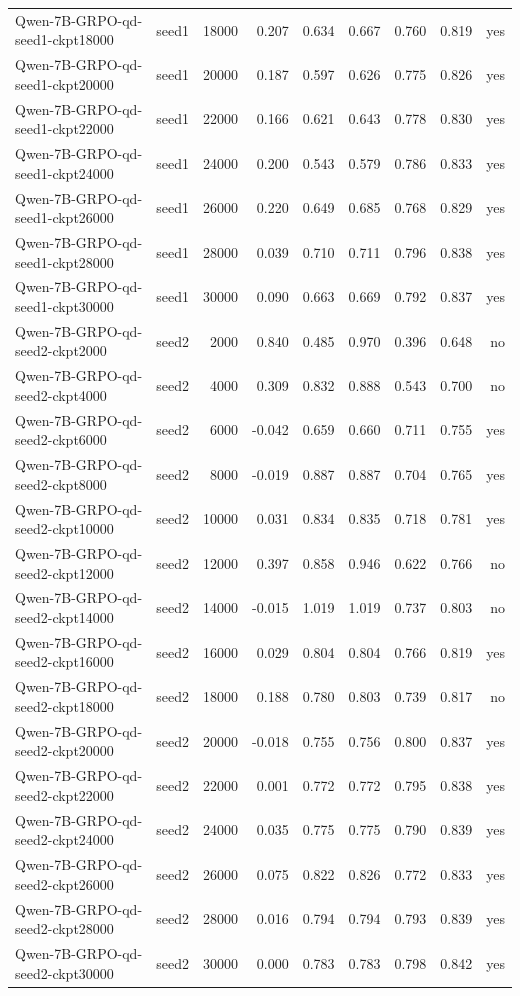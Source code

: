 \begin{tabular}{llrrrrrrr}
Qwen-7B-GRPO-qd-seed1-ckpt18000 & seed1 & 18000 & 0.207 & 0.634 & 0.667 & 0.760 & 0.819 & yes \\
Qwen-7B-GRPO-qd-seed1-ckpt20000 & seed1 & 20000 & 0.187 & 0.597 & 0.626 & 0.775 & 0.826 & yes \\
Qwen-7B-GRPO-qd-seed1-ckpt22000 & seed1 & 22000 & 0.166 & 0.621 & 0.643 & 0.778 & 0.830 & yes \\
Qwen-7B-GRPO-qd-seed1-ckpt24000 & seed1 & 24000 & 0.200 & 0.543 & 0.579 & 0.786 & 0.833 & yes \\
Qwen-7B-GRPO-qd-seed1-ckpt26000 & seed1 & 26000 & 0.220 & 0.649 & 0.685 & 0.768 & 0.829 & yes \\
Qwen-7B-GRPO-qd-seed1-ckpt28000 & seed1 & 28000 & 0.039 & 0.710 & 0.711 & 0.796 & 0.838 & yes \\
Qwen-7B-GRPO-qd-seed1-ckpt30000 & seed1 & 30000 & 0.090 & 0.663 & 0.669 & 0.792 & 0.837 & yes \\
Qwen-7B-GRPO-qd-seed2-ckpt2000 & seed2 & 2000 & 0.840 & 0.485 & 0.970 & 0.396 & 0.648 & no \\
Qwen-7B-GRPO-qd-seed2-ckpt4000 & seed2 & 4000 & 0.309 & 0.832 & 0.888 & 0.543 & 0.700 & no \\
Qwen-7B-GRPO-qd-seed2-ckpt6000 & seed2 & 6000 & -0.042 & 0.659 & 0.660 & 0.711 & 0.755 & yes \\
Qwen-7B-GRPO-qd-seed2-ckpt8000 & seed2 & 8000 & -0.019 & 0.887 & 0.887 & 0.704 & 0.765 & yes \\
Qwen-7B-GRPO-qd-seed2-ckpt10000 & seed2 & 10000 & 0.031 & 0.834 & 0.835 & 0.718 & 0.781 & yes \\
Qwen-7B-GRPO-qd-seed2-ckpt12000 & seed2 & 12000 & 0.397 & 0.858 & 0.946 & 0.622 & 0.766 & no \\
Qwen-7B-GRPO-qd-seed2-ckpt14000 & seed2 & 14000 & -0.015 & 1.019 & 1.019 & 0.737 & 0.803 & no \\
Qwen-7B-GRPO-qd-seed2-ckpt16000 & seed2 & 16000 & 0.029 & 0.804 & 0.804 & 0.766 & 0.819 & yes \\
Qwen-7B-GRPO-qd-seed2-ckpt18000 & seed2 & 18000 & 0.188 & 0.780 & 0.803 & 0.739 & 0.817 & no \\
Qwen-7B-GRPO-qd-seed2-ckpt20000 & seed2 & 20000 & -0.018 & 0.755 & 0.756 & 0.800 & 0.837 & yes \\
Qwen-7B-GRPO-qd-seed2-ckpt22000 & seed2 & 22000 & 0.001 & 0.772 & 0.772 & 0.795 & 0.838 & yes \\
Qwen-7B-GRPO-qd-seed2-ckpt24000 & seed2 & 24000 & 0.035 & 0.775 & 0.775 & 0.790 & 0.839 & yes \\
Qwen-7B-GRPO-qd-seed2-ckpt26000 & seed2 & 26000 & 0.075 & 0.822 & 0.826 & 0.772 & 0.833 & yes \\
Qwen-7B-GRPO-qd-seed2-ckpt28000 & seed2 & 28000 & 0.016 & 0.794 & 0.794 & 0.793 & 0.839 & yes \\
Qwen-7B-GRPO-qd-seed2-ckpt30000 & seed2 & 30000 & 0.000 & 0.783 & 0.783 & 0.798 & 0.842 & yes \\
\bottomrule
\end{tabular}

